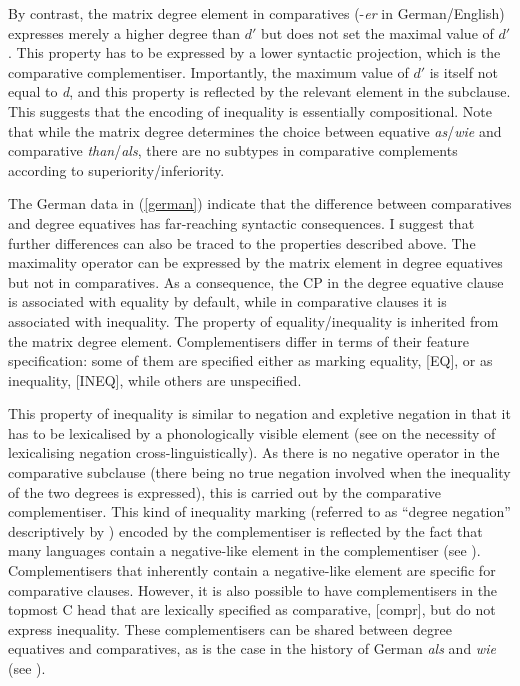 \begin{sloppypar}
By contrast, the matrix degree element in comparatives (-\textit{er} in German\slash English) expresses merely a higher degree than $d'$ but does not set the maximal value of $d'$. This property has to be expressed by a lower syntactic projection, which is the comparative complementiser. Importantly, the maximum value of $d'$ is itself not equal to \textit{d}, and this property is reflected by the relevant element in the subclause. This suggests that the encoding of inequality is essentially compositional. Note that while the matrix degree determines the choice between equative \textit{as}/\textit{wie} and comparative \textit{than}/\textit{als}, there are no subtypes in comparative complements according to superiority/inferiority.
\end{sloppypar}

The German data in (\ref{german}) indicate that the difference between comparatives and degree equatives has far-reaching syntactic consequences. I suggest that further differences can also be traced to the properties described above. The maximality operator can be expressed by the matrix element in degree equatives but not in comparatives. As a consequence, the CP in the degree equative clause is associated with equality by default, while in comparative clauses it is associated with inequality. The property of equality/inequality is inherited from the matrix degree element. Complementisers differ in terms of their feature specification: some of them are specified either as marking equality, [EQ], or as inequality, [INEQ], while others are unspecified.

This property of inequality is similar to negation and expletive negation in that it has to be lexicalised by a phonologically visible element (see \citealt{dryer2013} on the necessity of lexicalising negation cross-linguistically). As there is no negative operator in the comparative subclause (there being no true negation involved when the inequality of the two degrees is expressed), this is carried out by the comparative complementiser. This kind of inequality marking (referred to as ``degree negation'' descriptively by \citealt{bacskaiatkari2016alh}) encoded by the complementiser is reflected by the fact that many languages contain a negative-like element in the complementiser (see \citealt{bacskaiatkari2016alh}). Complementisers that inherently contain a negative-like element are specific for comparative clauses. However, it is also possible to have complementisers in the topmost C head that are lexically specified as comparative, [compr], but do not express inequality. These complementisers can be shared between degree equatives and comparatives, as is the case in the history of German \textit{als} and \textit{wie} (see \citealt{jaeger2018}).

